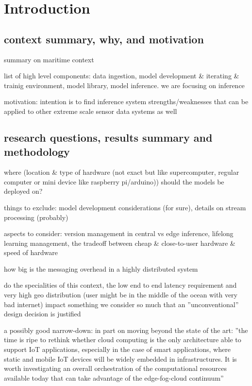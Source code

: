 \chapter{Introduction}

\section{context summary, why, and motivation}
summary on maritime context

list of high level components: data ingestion, model development & iterating & trainig environment, model library, model inference. we are focusing on inference

motivation: intention is to find inference system strengths/weaknesses that can be applied to other extreme scale sensor data systems as well

\section{research questions, results summary and methodology}

where (location & type of hardware (not exact but like supercomputer, regular computer or mini device like raspberry pi/arduino)) should the models be deployed on?

things to exclude: model development considerations (for sure), details on stream processing (probably)

aspects to consider: version management in central vs edge inference, lifelong learning management, the tradeoff between cheap & close-to-user hardware & speed of hardware 

how big is the messaging overhead in a highly distributed system

do the specialities of this context, the low end to end latency requirement and very high geo distribution (user might be in the middle of the ocean with very bad internet) impact something we consider so much that an ''unconventional'' design decision is justified

a possibly good narrow-down: in \cite{D1.1} part on moving beyond the state of the art: ''the time is ripe  to  rethink  whether  cloud  computing  is  the  only  architecture  able  to  support  IoT  applications, especially  in  the  case  of  smart applications,  where  static  and  mobile  IoT  devices  will  be  widely embedded  in  infrastructures.  It  is  worth  investigating  an  overall  orchestration  of  the  computational resources  available  today  that  can  take  advantage  of  the  edge-fog-cloud  continuum''

